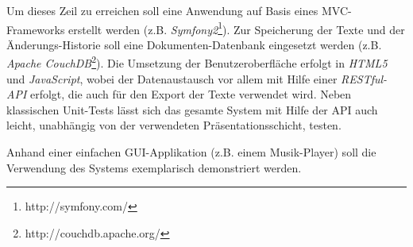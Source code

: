 \documentclass[11pt,a4paper]{article}
\begin{document}
Um dieses Zeil zu erreichen soll eine Anwendung auf Basis eines MVC-Frameworks erstellt werden (z.B. \emph{Symfony2}\footnote{http://symfony.com/}). Zur Speicherung der Texte und der Änderungs-Historie soll eine Dokumenten-Datenbank eingesetzt werden (z.B. \emph{Apache CouchDB}\footnote{http://couchdb.apache.org/}). Die Umsetzung der Benutzeroberfläche erfolgt in \emph{HTML5} und \emph{JavaScript}, wobei der Datenaustausch vor allem mit Hilfe einer \emph{RESTful-API} erfolgt, die auch für den Export der Texte verwendet wird. Neben klassischen Unit-Tests lässt sich das gesamte System mit Hilfe der API auch leicht, unabhängig von der verwendeten Präsentationsschicht, testen.

Anhand einer einfachen GUI-Applikation (z.B. einem Musik-Player) soll die Verwendung des Systems exemplarisch  demonstriert werden.
\end{document}
